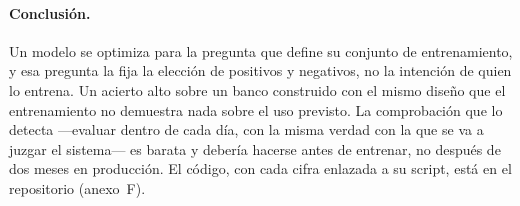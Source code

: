 \documentclass[11pt,a4paper]{article}
\begin{document}
\paragraph{Conclusión.} Un modelo se optimiza para la pregunta que define su
conjunto de entrenamiento, y esa pregunta la fija la elección de positivos y
negativos, no la intención de quien lo entrena. Un acierto alto sobre un banco
construido con el mismo diseño que el entrenamiento no demuestra nada sobre el
uso previsto. La comprobación que lo detecta ---evaluar dentro de cada día,
con la misma verdad con la que se va a juzgar el sistema--- es barata y
debería hacerse antes de entrenar, no después de dos meses en producción. El
código, con cada cifra enlazada a su script, está en el repositorio
(anexo~F).
\end{document}
